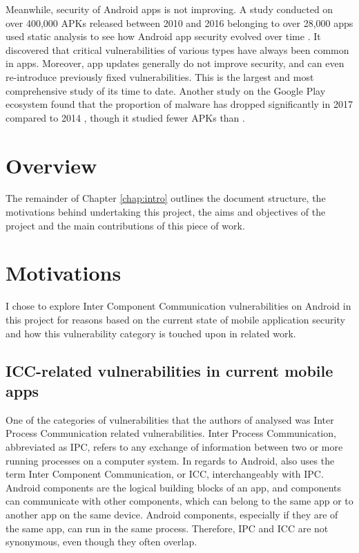         Meanwhile, security of Android apps is not improving. A study conducted on over 400,000 APKs released between 2010 and 2016 belonging to over 28,000 apps used static analysis to see how Android app security evolved over time \cite{android_vulnerabilities_evolution}. It discovered that critical vulnerabilities of various types have always been common in apps. Moreover, app updates generally do not improve security, and can even re-introduce previously fixed vulnerabilities. This is the largest and most comprehensive study of its time to date. Another study on the Google Play ecosystem found that the proportion of malware has dropped significantly in 2017 compared to 2014 \cite{newer_android_vulnerabilities_evolution}, though it studied fewer APKs than \cite{android_vulnerabilities_evolution}.
        
    \section{Overview}  
		\label{sec:intro_overview} 
		
		The remainder of Chapter \ref{chap:intro} outlines the document structure, the motivations behind undertaking this project, the aims and objectives of the project and the main contributions of this piece of work.
		
	\section{Motivations}
	    \label{sec:intro_motivations}
	    
	    I chose to explore Inter Component Communication vulnerabilities on Android in this project for reasons based on the current state of mobile application security and how this vulnerability category is touched upon in related work.
	    
	    \subsection{ICC-related vulnerabilities in current mobile apps}
	        \label{subsec:ICC_vulnerabilities_current_apps}
	    
    	One of the categories of vulnerabilities that the authors of \cite{pt_mobile_apps_2019} analysed was Inter Process Communication related vulnerabilities. Inter Process Communication, abbreviated as IPC, refers to any exchange of information between two or more running processes on a computer system. In regards to Android, \cite{pt_mobile_apps_2019} also uses the term Inter Component Communication, or ICC, interchangeably with IPC. Android components are the logical building blocks of an app, and components can communicate with other components, which can belong to the same app or to another app on the same device. Android components, especially if they are of the same app, can run in the same process. Therefore, IPC and ICC are not synonymous, even though they often overlap.
    	
